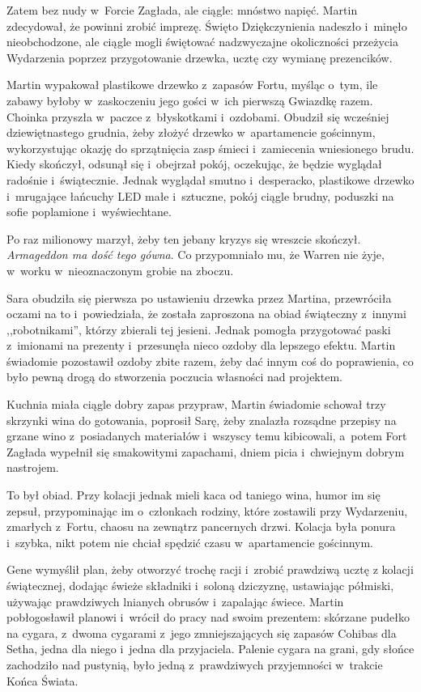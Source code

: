\documentclass[oneside,polish,11pt,sfheadings]{mwbk}
\begin{document}
Zatem bez nudy w~Forcie Zagłada, ale ciągle: mnóstwo napięć. Martin
zdecydował, że powinni zrobić imprezę. Święto Dziękczynienia nadeszło i~minęło nieobchodzone, ale ciągle mogli świętować nadzwyczajne
okoliczności przeżycia Wydarzenia poprzez przygotowanie drzewka, ucztę
czy wymianę prezencików.

Martin wypakował plastikowe drzewko z~zapasów Fortu, myśląc o~tym, ile
zabawy byłoby w~zaskoczeniu jego gości w~ich pierwszą Gwiazdkę razem.
Choinka przyszła w~paczce z~błyskotkami i~ozdobami. Obudził się
wcześniej dziewiętnastego grudnia, żeby złożyć drzewko w~apartamencie
gościnnym, wykorzystując okazję do sprzątnięcia zasp śmieci i~zamiecenia
wniesionego brudu. Kiedy skończył, odsunął się i~obejrzał pokój,
oczekując, że będzie wyglądał radośnie i~świątecznie. Jednak wyglądał
smutno i~desperacko, plastikowe drzewko i~mrugające łańcuchy LED małe i~sztuczne, pokój ciągle brudny, poduszki na sofie poplamione i~wyświechtane.

Po raz milionowy marzył, żeby ten jebany kryzys się wreszcie skończył.
\textit{Armageddon ma dość tego gówna}. Co przypomniało mu, że Warren nie
żyje, w~worku w~nieoznaczonym grobie na zboczu.

Sara obudziła się pierwsza po ustawieniu drzewka przez Martina,
przewróciła oczami na to i~powiedziała, że została zaproszona na obiad
świąteczny z~innymi ,,robotnikami'', którzy zbierali tej jesieni. Jednak
pomogła przygotować paski z~imionami na prezenty i~przesunęła nieco
ozdoby dla lepszego efektu. Martin świadomie pozostawił ozdoby zbite
razem, żeby dać innym coś do poprawienia, co było pewną drogą do
stworzenia poczucia własności nad projektem.

Kuchnia miała ciągle dobry zapas przypraw, Martin świadomie schował trzy
skrzynki wina do gotowania, poprosił Sarę, żeby znalazła rozsądne
przepisy na grzane wino z~posiadanych materiałów i~wszyscy temu
kibicowali, a~potem Fort Zagłada wypełnił się smakowitymi zapachami,
dniem picia i~chwiejnym dobrym nastrojem.

To był obiad. Przy kolacji jednak mieli kaca od taniego wina, humor im
się zepsuł, przypominając im o~członkach rodziny, które zostawili przy
Wydarzeniu, zmarłych z~Fortu, chaosu na zewnątrz pancernych drzwi.
Kolacja była ponura i~szybka, nikt potem nie chciał spędzić czasu w~apartamencie gościnnym.

Gene wymyślił plan, żeby otworzyć trochę racji i~zrobić prawdziwą ucztę
z kolacji świątecznej, dodając świeże składniki i~soloną dziczyznę,
ustawiając półmiski, używając prawdziwych lnianych obrusów i~zapalając
świece. Martin pobłogosławił planowi i~wrócił do pracy nad swoim
prezentem: skórzane pudełko na cygara, z~dwoma cygarami z~jego
zmniejszających się zapasów Cohibas dla Setha, jedna dla niego i~jedna
dla przyjaciela. Palenie cygara na grani, gdy słońce zachodziło nad
pustynią, było jedną z~prawdziwych przyjemności w~trakcie Końca Świata.
\end{document}
